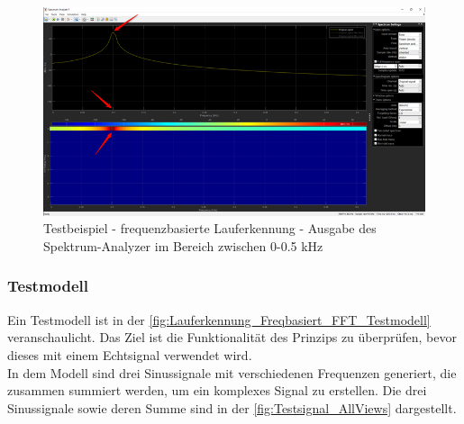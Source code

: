 
\begin{figure}[H]
	\centering
	\includegraphics[width=\linewidth]{Bilder/Lauferkennung_Freqbasiert_SpektrumAnalyzerAusgabe_gezoomt.png}
	\caption{Testbeispiel - frequenzbasierte Lauferkennung - Ausgabe des Spektrum-Analyzer im Bereich zwischen 0-0.5 kHz}
	\label{fig:Lauferkennung_Freqbasiert_SpektrumAnalyzerAusgabe_gezoomt}
\end{figure}

%

\subsubsection{Testmodell}
Ein Testmodell ist in der \autoref{fig:Lauferkennung_Freqbasiert_FFT_Testmodell} veranschaulicht. Das Ziel ist die Funktionalität des Prinzips zu überprüfen, bevor dieses mit einem Echtsignal verwendet wird.\\
In dem Modell sind drei Sinussignale mit verschiedenen Frequenzen generiert, die zusammen summiert werden, um ein komplexes Signal zu erstellen.
Die drei Sinussignale sowie deren Summe sind in der \autoref{fig:Testsignal_AllViews} dargestellt.

